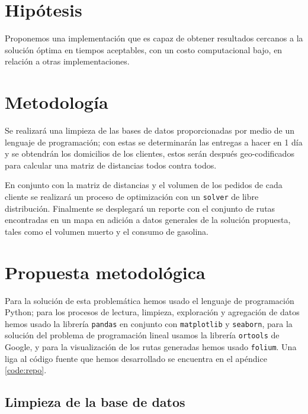 \documentclass[journal]{IEEEtran}
\begin{document}
    \section{Hipótesis} \label{sec:hyp}
            
        Proponemos una implementación que es capaz de obtener resultados cercanos a la solución óptima en tiempos aceptables, con un costo computacional bajo, en relación a otras implementaciones. 
    
    \section{Metodología} \label{sec:method}

        Se realizará una limpieza de las bases de datos proporcionadas por medio de un lenguaje de programación; con estas se determinarán las entregas a hacer en 1 día y se obtendrán los domicilios de los clientes, estos serán después geo-codificados para calcular una matriz de distancias todos contra todos.

        En conjunto con la matriz de distancias y el volumen de los pedidos de cada cliente se realizará un proceso de optimización con un \texttt{solver} de libre distribución. Finalmente se desplegará un reporte con el conjunto de rutas encontradas en un mapa en adición a datos generales de la solución propuesta, tales como el volumen muerto y el consumo de gasolina.

    \section{Propuesta metodológica} \label{sec:prop-method}
    
        Para la solución de esta problemática hemos usado el lenguaje de programación Python; para los procesos de lectura, limpieza, exploración y agregación de datos hemos usado la librería \texttt{pandas} en conjunto con \texttt{matplotlib} y \texttt{seaborn}, para la solución del problema de programación lineal usamos la librería \texttt{ortools} de Google, y para la visualización de los rutas generadas hemos usado \texttt{folium}. Una liga al código fuente que hemos desarrollado se encuentra en el apéndice \ref{code:repo}.
        
        \subsection{Limpieza de la base de datos} \label{stage 1}
            
\end{document}
